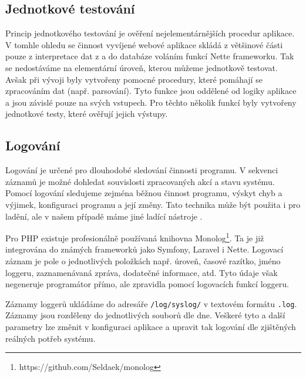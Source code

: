 \documentclass[czech,BP]{thesiskiv}
\begin{document}
		\subsection{Jednotkové testování}
		\par Princip jednotkového testování je ověření nejelementárnějších procedur aplikace. V tomhle ohledu se činnost vyvíjené webové aplikace skládá z většinové části pouze z interpretace dat z a do databáze voláním funkcí Nette frameworku. Tak se nedostáváme na elementární úroveň, kterou můžeme jednotkově testovat. Avšak při vývoji byly vytvořeny pomocné procedury, které pomáhají se zpracováním dat (např. parsování). Tyto funkce jsou oddělené od logiky aplikace a jsou závislé pouze na svých vstupech. Pro těchto několik funkcí byly vytvořeny jednotkové testy, které ověřují jejich výstupy.
		
		\subsection{Logování}
		\par Logování je určené pro dlouhodobé sledování činnosti programu. V sekvenci záznamů je možné dohledat souvislosti zpracovaných akcí a stavu systému. Pomocí logování sledujeme zejména běžnou činnost programu, výskyt chyb a výjimek, konfiguraci programu a její změny. Tato technika může být použita i pro ladění, ale v našem případě máme jiné ladící nástroje \cite{OKSPrednasky}.
		\par Pro PHP existuje profesionálně používaná knihovna Monolog\footnote{https://github.com/Seldaek/monolog}. Ta je již integrována do známých frameworků jako Symfony, Laravel i Nette. Logovací záznam je pole o jednotlivých položkách např. úroveň, časové razítko, jméno loggeru, zaznamenávaná zpráva, dodatečné informace, atd. Tyto údaje však negeneruje programátor přímo, ale zpravidla pomocí logovacích funkcí loggeru.
		\par Záznamy loggerů ukládáme do adresáře \texttt{/log/syslog/} v textovém formátu \texttt{.log}. Záznamy jsou rozděleny do jednotlivých souborů dle dne. Veškeré tyto a další parametry lze změnit v konfiguraci aplikace a upravit tak logování dle zjištěných reálných potřeb systému.
		
\end{document}
